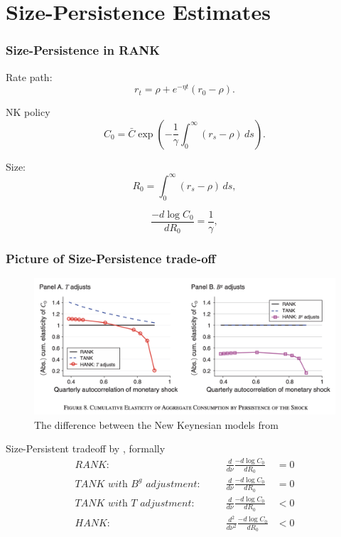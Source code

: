 \documentclass[11pt,pdf,aspectratio=129]{beamer}
\begin{document}
\section{Size-Persistence Estimates}

\begin{frame}\frametitle{Size-Persistence in RANK}
    Rate path:
        \begin{equation*}
            r_t=\rho+e^{-\eta t}(r_0-\rho).\label{eq:InterestRatePath}
        \end{equation*}
    
    NK policy    
    \[C_0=\bar C\exp\left(-\frac{1}{\gamma}\int_0^\infty \left(r_s-\rho\right)\,ds\right).\]
    
    Size:
    \begin{equation*}
        R_0=\int_0^\infty \left(r_s-\rho\right)\,ds,\label{eq:KMVsize}
    \end{equation*}
    
    
    \[\frac{-d \log C_0}{dR_0}=\frac{1}{\gamma},\]
    
    
    \end{frame}
    
    \begin{frame}\frametitle{Picture of Size-Persistence trade-off}
        \begin{figure}\centering
            \includegraphics[scale=0.47]{Size_Persistence_KMV.png}
            \caption{The difference between the New Keynesian models from \citet{KMV2018}}
        \end{figure}
    \end{frame}
    
    
    \begin{frame}{Size-Persistent tradeoff by \citet{KMV2018}, formally}
        \begin{align}
            \textit{RANK:}&\quad& \frac{d}{d\nu}\frac{-d\log C_0}{dR_0}&=0     \label{eq:SizePersistenceRANK}\\
        \textit{TANK with $B^g$ adjustment:}&\quad& \frac{d}{d\nu}\frac{-d\log C_0}{dR_0}&= 0     \label{eq:SizePersistenceTANK_B}\\
        \textit{TANK with $T$ adjustment:}&\quad& \frac{d}{d\nu}\frac{-d\log C_0}{dR_0}&< 0     \label{eq:SizePersistenceTANK_T}\\
        \textit{HANK:}& \quad& 
            \frac{d^2}{d\nu ^2}\frac{-d\log C_0}{dR_0}&<0
            \label{eq:SizePersistenceHANK}
        \end{align}
        
    \end{frame}
\end{document}
